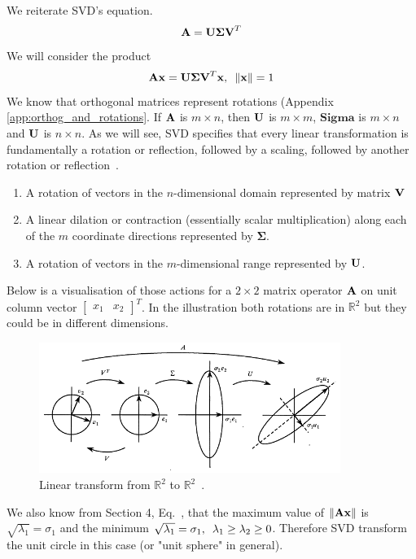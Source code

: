 \documentclass[a4paper]{article}
\numberwithin{equation}{section} %
\newcounter{example}
\newcommand{\setR}{\mathbb{R}} %
\newcommand{\norm}[1] {\lVert #1 \rVert} %
\newcommand{\hquad}{\hskip0.5em\relax}%
\newcommand{\B}[1]{\textbf{\textup{#1}}} %
\renewcommand{\eqref}{Eq.~\originaleqref}
\renewcommand*{\eqref}[1]{Eq.~\originaleqref{#1}}
\begin{document}
We reiterate SVD's equation.
\[
\B{A}=\B{U}\boldsymbol{\Sigma}\B{V}^T
\]
We will consider the product
\[
\B{A}\B{x}=\B{U}\boldsymbol{\Sigma}\B{V}^T\B{x}, \hquad \norm{\B{x}}=1
\]
We know that orthogonal matrices represent rotations (Appendix \ref{app:orthog_and_rotations}. If $\B{A}$ is $m \times n$, then $\B{U}$ is $m \times m$, $\boldsymbol{Sigma}$ is $m \times n$ and $\B{U}$ is $n \times n$. As we will see, SVD specifies that every linear transformation is fundamentally a rotation or reflection, followed by a scaling, followed by another rotation or reflection~\cite{lec_notes_geijin}.
\begin{enumerate}
\item A rotation of vectors in the $n$-dimensional domain represented by matrix $\B{V}$
\item A linear dilation or contraction (essentially scalar multiplication) along each of the $m$ coordinate directions represented by $\boldsymbol{\Sigma}$.
\item A rotation of vectors in the $m$-dimensional range represented by $\B{U}$.
\end{enumerate}
Below is a visualisation of those actions for a $2 \times 2$ matrix operator $\B{A}$ on unit column vector $\begin{bmatrix}x_1 & x_2 \end{bmatrix}^T$. In the illustration both rotations are in $\setR^2$ but they could be in different dimensions.
\begin{figure}[H]
	\centering %
	\includegraphics[height=4.25cm]{SVD_visual_01.png}
    \caption{Linear transform from $\setR^2$ to $\setR^2$~\cite{strang09}.}
    \label{fig:circle_to_ellipse_example}
\end{figure}
We also know from Section 4, \eqref{eq:max_min}, that the maximum value of $\norm{\B{Ax}}$ is $\sqrt{\lambda_1}=\sigma_1$ and the minimum $\sqrt{\lambda_1}=\sigma_1,\hquad \lambda_1 \geq \lambda_2 \geq 0$. Therefore SVD transform the unit circle in this case (or "unit sphere" in general).
\end{document}
